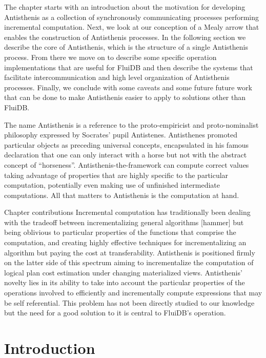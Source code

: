 The chapter starts with an introduction about the motivation for
developing Antisthenis as a collection of synchronously communicating
processes performing incremental computation. Next, we look at our
conception of a Mealy arrow that enables the construction of
Antisthenis processes. In the following section we describe the core
of Antisthenis, which is the structure of a single Antisthenis
process. From there we move on to describe some specific operation
implementations that are useful for FluiDB and then describe the
systems that facilitate intercommunication and high level organization
of Antisthenis processes. Finally, we conclude with some caveats and
some future future work that can be done to make Antisthenis easier to
apply to solutions other than FluiDB.

The name Antisthenis is a reference to the proto-empiricist
and proto-nominalist philosophy expressed by Socrates'
pupil Antistenes. Antisthenes promoted particular objects as
preceding universal concepts, encapsulated in his famous
declaration that one can only interact with a horse but not
with the abstract concept of ``horseness''. Antisthenis-the-framework can
compute correct values taking advantage of properties
that are highly specific to the particular computation, potentially
even making use of unfinished intermediate computations.
All that matters to Antisthenis is the computation at hand.


\begin{corrected}{Chapter contributions}
Incremental computation has traditionally been dealing with the tradeoff
between incrementalizing general algorithms [hammer] but being
oblivious to particular properties of the functions that comprise the
computation, and creating highly effective techniques for
incrementalizing an algorithm but paying the cost at
transferability. Antisthenis is positioned firmly on the latter side
of this spectrum aiming to incrementalize the computation of
logical plan cost estimation under changing materialized
views. Antisthenis' novelty lies in its ability to take into account
the particular properties of the operations involved to efficiently
and incrementally compute expressions that may be self
referential. This problem has not been directly studied to our
knowledge but the need for a good solution to it is central to
FluiDB's operation.
\end{corrected}


\section{Introduction}
\label{sec:antisthenis_intro}

